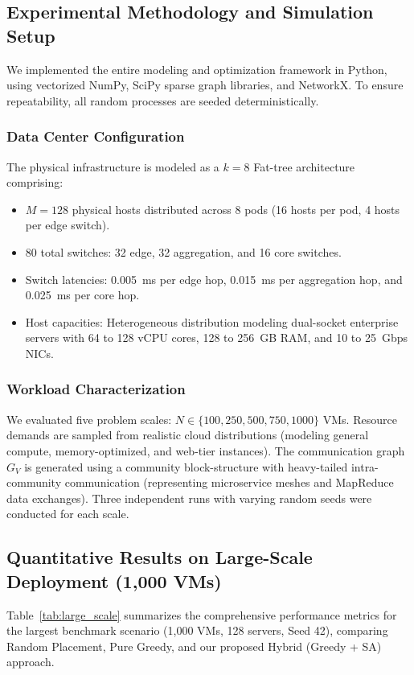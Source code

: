 \documentclass[conference]{IEEEtran}
\begin{document}
\subsection{Experimental Methodology and Simulation Setup}
We implemented the entire modeling and optimization framework in Python, using vectorized NumPy, SciPy sparse graph libraries, and NetworkX. To ensure repeatability, all random processes are seeded deterministically.

\subsubsection{Data Center Configuration}
The physical infrastructure is modeled as a $k=8$ Fat-tree architecture comprising:
\begin{itemize}
    \item $M = 128$ physical hosts distributed across 8 pods (16 hosts per pod, 4 hosts per edge switch).
    \item 80 total switches: 32 edge, 32 aggregation, and 16 core switches.
    \item Switch latencies: 0.005~ms per edge hop, 0.015~ms per aggregation hop, and 0.025~ms per core hop.
    \item Host capacities: Heterogeneous distribution modeling dual-socket enterprise servers with 64 to 128 vCPU cores, 128 to 256~GB RAM, and 10 to 25~Gbps NICs.
\end{itemize}

\subsubsection{Workload Characterization}
We evaluated five problem scales: $N \in \{100, 250, 500, 750, 1000\}$ VMs. Resource demands are sampled from realistic cloud distributions (modeling general compute, memory-optimized, and web-tier instances). The communication graph $G_V$ is generated using a community block-structure with heavy-tailed intra-community communication (representing microservice meshes and MapReduce data exchanges). Three independent runs with varying random seeds were conducted for each scale.

\subsection{Quantitative Results on Large-Scale Deployment (1,000 VMs)}
Table~\ref{tab:large_scale} summarizes the comprehensive performance metrics for the largest benchmark scenario (1,000 VMs, 128 servers, Seed 42), comparing Random Placement, Pure Greedy, and our proposed Hybrid (Greedy + SA) approach.
\end{document}
